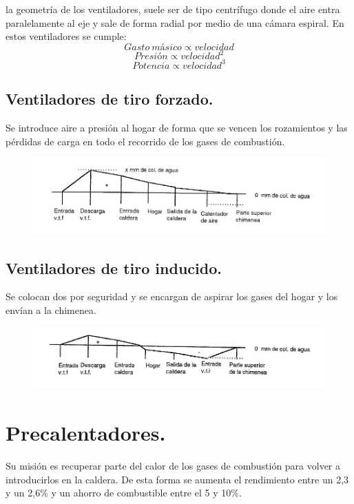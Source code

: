 la geometría de los ventiladores, suele ser de tipo centrífugo donde el aire entra paralelamente al eje y sale de forma radial por medio de una cámara espiral. En estos ventiladores se cumple:
\[Gasto \ másico \propto velocidad\]
\[Presión\propto velocidad^2\]
\[Potencia\propto velocidad^3\]


\subsection{Ventiladores de tiro forzado.}
Se introduce aire a presión al hogar de forma que se vencen los rozamientos y las pérdidas de carga en todo el recorrido de los gases de combustión.
\begin{figure}[H]
	\centering
	\includegraphics[width=0.7\linewidth]{res/tema10/forzao}
	\label{fig:forzao}
\end{figure}

\subsection{Ventiladores de tiro inducido.}
Se colocan dos por seguridad y se encargan de aspirar los gases del hogar y los envían a la chimenea.
\begin{figure}[H]
	\centering
	\includegraphics[width=0.7\linewidth]{res/tema10/inducio}
	\label{fig:inducio}
\end{figure}

\section{Precalentadores.}
Su misión es recuperar parte del calor de los gases de combustión para volver a introducirlos en la caldera. De esta forma se aumenta el rendimiento entre un 2,3 y un 2,6\% y un ahorro de combustible entre el 5 y 10\%.



